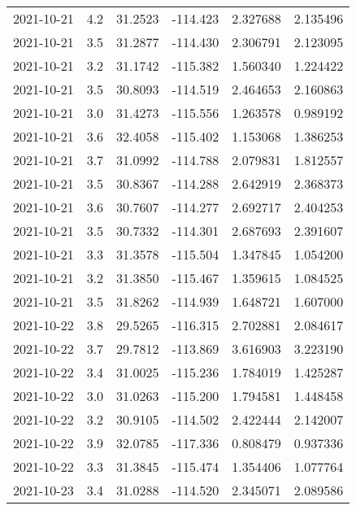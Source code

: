 \begin{tabular}{lrrrrr}
2021-10-21 &       4.2 &  31.2523 &  -114.423 &         2.327688 &         2.135496 \\
2021-10-21 &       3.5 &  31.2877 &  -114.430 &         2.306791 &         2.123095 \\
2021-10-21 &       3.2 &  31.1742 &  -115.382 &         1.560340 &         1.224422 \\
2021-10-21 &       3.5 &  30.8093 &  -114.519 &         2.464653 &         2.160863 \\
2021-10-21 &       3.0 &  31.4273 &  -115.556 &         1.263578 &         0.989192 \\
2021-10-21 &       3.6 &  32.4058 &  -115.402 &         1.153068 &         1.386253 \\
2021-10-21 &       3.7 &  31.0992 &  -114.788 &         2.079831 &         1.812557 \\
2021-10-21 &       3.5 &  30.8367 &  -114.288 &         2.642919 &         2.368373 \\
2021-10-21 &       3.6 &  30.7607 &  -114.277 &         2.692717 &         2.404253 \\
2021-10-21 &       3.5 &  30.7332 &  -114.301 &         2.687693 &         2.391607 \\
2021-10-21 &       3.3 &  31.3578 &  -115.504 &         1.347845 &         1.054200 \\
2021-10-21 &       3.2 &  31.3850 &  -115.467 &         1.359615 &         1.084525 \\
2021-10-21 &       3.5 &  31.8262 &  -114.939 &         1.648721 &         1.607000 \\
2021-10-22 &       3.8 &  29.5265 &  -116.315 &         2.702881 &         2.084617 \\
2021-10-22 &       3.7 &  29.7812 &  -113.869 &         3.616903 &         3.223190 \\
2021-10-22 &       3.4 &  31.0025 &  -115.236 &         1.784019 &         1.425287 \\
2021-10-22 &       3.0 &  31.0263 &  -115.200 &         1.794581 &         1.448458 \\
2021-10-22 &       3.2 &  30.9105 &  -114.502 &         2.422444 &         2.142007 \\
2021-10-22 &       3.9 &  32.0785 &  -117.336 &         0.808479 &         0.937336 \\
2021-10-22 &       3.3 &  31.3845 &  -115.474 &         1.354406 &         1.077764 \\
2021-10-23 &       3.4 &  31.0288 &  -114.520 &         2.345071 &         2.089586 \\

\end{tabular}
